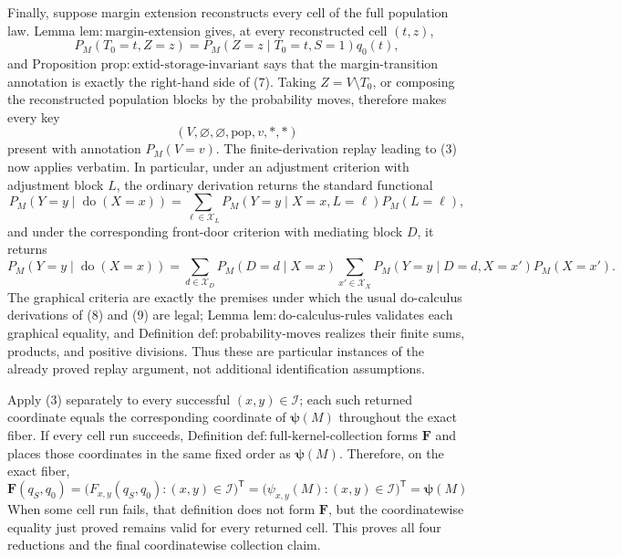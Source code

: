 Finally, suppose margin extension reconstructs every cell of the full population law.  Lemma \(\mathrm{lem{:}margin\text{-}extension}\) gives, at every reconstructed cell \((t,z)\),
\[
P_M(T_0=t,Z=z)
=P_M(Z=z\mid T_0=t,S=1)q_0(t), \tag{7}
\]
and Proposition \(\mathrm{prop{:}extid\text{-}storage\text{-}invariant}\) says that the margin-transition annotation is exactly the right-hand side of (7).  Taking \(Z=V\setminus T_0\), or composing the reconstructed population blocks by the probability moves, therefore makes every key
\[
(V,\varnothing,\varnothing,\mathrm{pop},v,\ast,\ast)
\]
present with annotation \(P_M(V=v)\).  The finite-derivation replay leading to (3) now applies verbatim.  In particular, under an adjustment criterion with adjustment block \(L\), the ordinary derivation returns the standard functional
\[
P_M(Y=y\mid\operatorname{do}(X=x))
=\sum_{\ell\in\mathcal X_L}P_M(Y=y\mid X=x,L=\ell)P_M(L=\ell), \tag{8}
\]
and under the corresponding front-door criterion with mediating block \(D\), it returns
\[
P_M(Y=y\mid\operatorname{do}(X=x))
=\sum_{d\in\mathcal X_D}P_M(D=d\mid X=x)
  \sum_{x'\in\mathcal X_X}P_M(Y=y\mid D=d,X=x')P_M(X=x'). \tag{9}
\]
The graphical criteria are exactly the premises under which the usual do-calculus derivations of (8) and (9) are legal; Lemma \(\mathrm{lem{:}do\text{-}calculus\text{-}rules}\) validates each graphical equality, and Definition \(\mathrm{def{:}probability\text{-}moves}\) realizes their finite sums, products, and positive divisions.  Thus these are particular instances of the already proved replay argument, not additional identification assumptions.

Apply (3) separately to every successful \((x,y)\in\mathcal I\); each such returned coordinate equals the corresponding coordinate of \(\boldsymbol\psi(M)\) throughout the exact fiber.  If every cell run succeeds, Definition \(\mathrm{def{:}full\text{-}kernel\text{-}collection}\) forms \(\mathbf F\) and places those coordinates in the same fixed order as \(\boldsymbol\psi(M)\).  Therefore, on the exact fiber,
\[
\mathbf F(q_S,q_0)
=\bigl(F_{x,y}(q_S,q_0):(x,y)\in\mathcal I\bigr)^{\mathsf T}
=\bigl(\psi_{x,y}(M):(x,y)\in\mathcal I\bigr)^{\mathsf T}
=\boldsymbol\psi(M)
\]
When some cell run fails, that definition does not form \(\mathbf F\), but the coordinatewise equality just proved remains valid for every returned cell.  This proves all four reductions and the final coordinatewise collection claim.